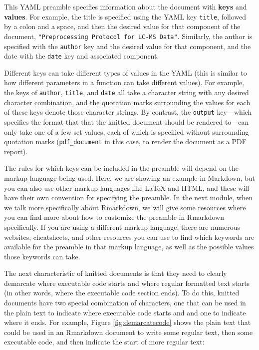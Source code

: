 \documentclass[]{tufte-book}
\begin{document}
This YAML preamble specifies information about the document with \textbf{keys} and
\textbf{values}. For example, the title is specified using the YAML key \texttt{title},
followed by a colon and a space, and then the desired value for that
component of the document, \texttt{"Preprocessing\ Protocol\ for\ LC-MS\ Data"}.
Similarly, the author is specified with the \texttt{author} key and the desired
value for that component, and the date with the \texttt{date} key and associated
component.

Different keys can take different types of values in the YAML
(this is similar to how different parameters in a function can take different values). For example, the keys of \texttt{author}, \texttt{title}, and \texttt{date} all take
a character string with any desired character combination, and the quotation
marks surrounding the values for each of these keys denote those character strings. By contrast, the \texttt{output} key---which specifies the format that
that the knitted document should be rendered to---can only take one of a
few set values, each of which is specified without surrounding
quotation marks (\texttt{pdf\_document} in this case, to render the document
as a PDF report).

The rules for which keys can be included in the preamble will depend on the
markup language being used. Here, we are showing an example in Markdown, but you
can also use other markup languages like LaTeX and HTML, and these will have
their own convention for specifying the preamble. In the next module, when we
talk more specifically about Rmarkdown, we will give some resources where you
can find more about how to customize the preamble in Rmarkdown specifically. If
you are using a different markup language, there are numerous websites,
cheatsheets, and other resources you can use to find which keywords are
available for the preamble in that markup language, as well as the possible
values those keywords can take.

The next characteristic of knitted documents is that they need to clearly
demarcate where executable code starts and where regular formatted text starts
(in other words, where the executable code section ends). To do this, knitted
documents have two special combination of characters, one that can be used in
the plain text to indicate where executable code starts and and one to indicate
where it ends. For example, Figure \ref{fig:demarcatecode} shows the plain text
that could be used in an Rmarkdown document to write some regular text, then
some executable code, and then indicate the start of more regular text:
\end{document}
